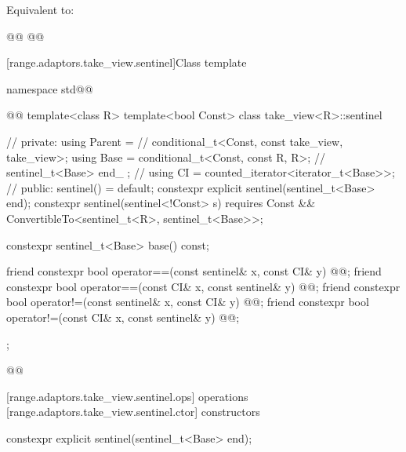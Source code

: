 \begin{itemdescr}
\pnum
\effects Equivalent to:
\begin{codeblock}
@@
@@
\end{codeblock}
\end{itemdescr}

[range.adaptors.take_view.sentinel]{Class template }

\pnum
{}

\begin{codeblock}
namespace std@@ { @@
  template<class R>
  template<bool Const>
  class take_view<R>::sentinel { // \expos
  private:
    using Parent =                                 // \expos
      conditional_t<Const, const take_view, take_view>;
    using Base = conditional_t<Const, const R, R>; // \expos
    sentinel_t<Base> end_ {};                      // \expos
    using CI = counted_iterator<iterator_t<Base>>; // \expos
  public:
    sentinel() = default;
    constexpr explicit sentinel(sentinel_t<Base> end);
    constexpr sentinel(sentinel<!Const> s)
      requires Const && ConvertibleTo<sentinel_t<R>, sentinel_t<Base>>;

    constexpr sentinel_t<Base> base() const;

    friend constexpr bool operator==(const sentinel& x, const CI& y)
      @@;
    friend constexpr bool operator==(const CI& x, const sentinel& y)
      @@;
    friend constexpr bool operator!=(const sentinel& x, const CI& y)
      @@;
    friend constexpr bool operator!=(const CI& x, const sentinel& y)
      @@;
  };
}@\oldtxt{\}}@
\end{codeblock}

[range.adaptors.take_view.sentinel.ops]{ operations}
[range.adaptors.take_view.sentinel.ctor]{ constructors}

\begin{itemdecl}
constexpr explicit sentinel(sentinel_t<Base> end);
\end{itemdecl}

